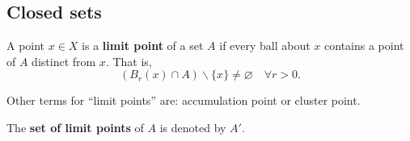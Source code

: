 \documentclass[12pt, a4paper]{article}
\begin{document}

\subsection{Closed sets}

\begin{definition}
    A point \(x \in X\) is a \textbf{limit point} of a set \(A\) if every ball about \(x\) contains a point of \(A\) distinct from \(x\). That is,
    \[\left( B_r(x) \cap A \right) \backslash \{x\} \neq \varnothing \quad \forall r>0.\]
\end{definition}

\begin{mdremark}
    Other terms for ``limit points'' are: accumulation point or cluster point.
\end{mdremark}

\begin{definition}
    The \textbf{set of limit points} of \(A\) is denoted by \(A'\).
\end{definition}
\end{document}
